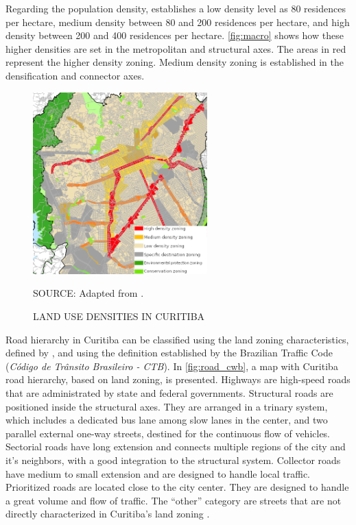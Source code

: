 Regarding the population density, \textcite{Curitiba2015} establishes a low density level as 80 residences per hectare, medium density between 80 and 200 residences per hectare, and high density between 200 and 400 residences per hectare. \autoref{fig:macro} shows how these higher densities are set in the metropolitan and structural axes. The areas in red represent the higher density zoning. Medium density zoning is established in the densification and connector axes. 

\begin{figure}[!htbp]
    \centering\footnotesize
    \captionsetup{font=footnotesize}
    \caption{LAND USE DENSITIES IN CURITIBA}
    \includegraphics[width=0.6\textwidth]{fig/macro3.png}
    \label{fig:macro}
    \par SOURCE: Adapted from \textcite{Curitiba2015}.
\end{figure}

Road hierarchy in Curitiba can be classified using the land zoning characteristics, defined by \textcite{Curitiba2019a}, and using the definition established by the Brazilian Traffic Code (\textit{Código de Trânsito Brasileiro - CTB}). In \autoref{fig:road_cwb}, a map with Curitiba road hierarchy, based on land zoning, is presented. Highways are high-speed roads that are administrated by state and federal governments. Structural roads are positioned inside the structural axes. They are arranged in a trinary system, which includes a dedicated bus lane among slow lanes in the center, and two parallel external one-way streets, destined for the continuous flow of vehicles. Sectorial roads have long extension and connects multiple regions of the city and it's neighbors, with a good integration to the structural system. Collector roads have medium to small extension and are designed to handle local traffic. Prioritized roads are located close to the city center. They are designed to handle a great volume and flow of traffic. The ``other'' category are streets that are not directly characterized in Curitiba's land zoning \cite{Curitiba2019a}. 

